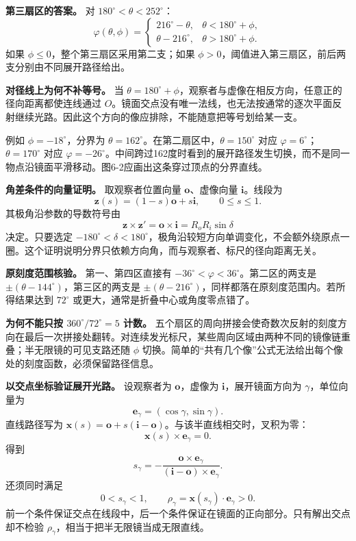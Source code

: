 \documentclass[12pt,a4paper,UTF8]{ctexart}
\begin{document}
\textbf{第三扇区的答案。} 对 \(180^\circ<\theta<252^\circ\)： \[
\boxed{
\varphi(\theta,\phi)=
\begin{cases}
216^\circ-\theta,&\theta<180^\circ+\phi,\\
\theta-216^\circ,&\theta>180^\circ+\phi.
\end{cases}}
\] 如果 \(\phi\le0\)，整个第三扇区采用第二支；如果
\(\phi>0\)，阈值进入第三扇区，前后两支分别由不同展开路径给出。

\textbf{对径线上为何不补等号。} 当
\(\theta=180^\circ+\phi\)，观察者与虚像在相反方向，任意正的径向距离都使连线通过
\(O\)。镜面交点没有唯一法线，也无法按通常的逐次平面反射继续光路。因此这个方向的像应排除，不能随意把等号划给某一支。

例如 \(\phi=-18^\circ\)，分界为
\(\theta=162^\circ\)。在第二扇区中，\(\theta=150^\circ\) 对应
\(\varphi=6^\circ\)；\(\theta=170^\circ\) 对应
\(\varphi=-26^\circ\)。中间跨过162度时看到的展开路径发生切换，而不是同一物点沿镜面平滑移动。图6-2应画出这条穿过顶点的分界直线。

\textbf{角差条件的向量证明。} 取观察者位置向量
\(\boldsymbol o\)、虚像向量 \(\boldsymbol i\)。线段为 \[
\boldsymbol z(s)=(1-s)\boldsymbol o+s\boldsymbol i,
\qquad0\le s\le1.
\] 其极角沿参数的导数符号由 \[
\boldsymbol z\times\boldsymbol z'
=\boldsymbol o\times\boldsymbol i
=R_oR_i\sin\delta
\] 决定。只要选定
\(-180^\circ<\delta<180^\circ\)，极角沿较短方向单调变化，不会额外绕原点一圈。这个证明说明分界只依赖方向角，而与观察者、标尺的径向距离无关。

\textbf{原刻度范围核验。} 第一、第四区直接有
\(-36^\circ<\varphi<36^\circ\)。第二区的两支是
\(\pm(\theta-144^\circ)\)，第三区的两支是
\(\pm(\theta-216^\circ)\)，同样都落在原刻度范围内。若所得结果达到
\(72^\circ\) 或更大，通常是折叠中心或角度零点错了。

\textbf{为何不能只按 \(360^\circ/72^\circ=5\) 计数。}
五个扇区的周向拼接会使奇数次反射的刻度方向在最后一次拼接处翻转。对连续发光标尺，某些周向区域由两种不同的镜像链重叠；半无限镜的可见支路还随
\(\phi\)
切换。简单的``共有几个像''公式无法给出每个像处的刻度函数，必须保留路径信息。

\textbf{以交点坐标验证展开光路。} 设观察者为 \(\boldsymbol o\)，虚像为
\(\boldsymbol i\)，展开镜面方向为 \(\gamma\)，单位向量为 \[
\boldsymbol e_\gamma=(\cos\gamma,\sin\gamma).
\] 直线路径写为
\(\boldsymbol x(s)=\boldsymbol o+s(\boldsymbol i-\boldsymbol o)\)。与该半直线相交时，叉积为零：
\[
\boldsymbol x(s)\times\boldsymbol e_\gamma=0.
\] 得到 \[
s_\gamma=
-\frac{\boldsymbol o\times\boldsymbol e_\gamma}
{(\boldsymbol i-\boldsymbol o)\times\boldsymbol e_\gamma}.
\] 还须同时满足 \[
0<s_\gamma<1,\qquad
\rho_\gamma=\boldsymbol x(s_\gamma)\cdot\boldsymbol e_\gamma>0.
\]
前一个条件保证交点在线段中，后一个条件保证在镜面的正向部分。只有解出交点却不检验
\(\rho_\gamma\)，相当于把半无限镜当成无限直线。
\end{document}
